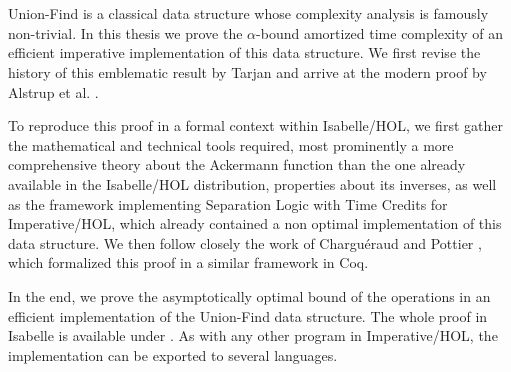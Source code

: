 \chapter{\abstractname}

Union-Find is a classical data structure whose complexity analysis is famously non-trivial. In this thesis we prove the $\alpha$-bound amortized time complexity of an efficient imperative implementation of this data structure. We first revise the history of this emblematic result by Tarjan \cite{Tarjan1975b} and arrive at the modern proof by Alstrup et al. \cite{Alstrup14}.

To reproduce this proof in a formal context within Isabelle/HOL, we first gather the mathematical and technical tools required, most prominently a more comprehensive theory about the Ackermann function than the one already available in the Isabelle/HOL distribution, properties about its inverses, as well as the framework implementing Separation Logic with Time Credits for Imperative/HOL, which already contained a non optimal implementation of this data structure. We then follow closely the work of Charguéraud and Pottier \cite{chargueraud17}, which formalized this proof in a similar framework in Coq.

In the end, we prove the asymptotically optimal bound of the operations in an efficient implementation of the Union-Find data structure. The whole proof in Isabelle is available under \cite{Loewenberg2019}. As with any other program in Imperative/HOL, the implementation can be exported to several languages.

